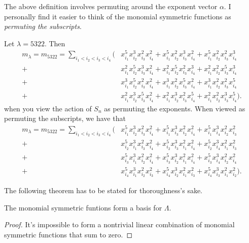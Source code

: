 \documentclass{article}
\begin{document}
The above definition involves permuting around the exponent vector $\alpha$. 
I personally find it easier to think of the monomial symmetric functions as \textit{permuting the subscripts}. 

\begin{example}
    Let $\lambda = 5322$. Then
    \begin{align*}
        m_\lambda = m_{5322} = \sum_{i_1<i_2<i_3<i_4} \Big(&x_{i_1}^5x_{i_2}^3x_{i_3}^2x_{i_4}^2 + x_{i_1}^5x_{i_2}^2x_{i_3}^3x_{i_4}^2 + x_{i_1}^5x_{i_2}^2x_{i_3}^2x_{i_4}^3 \\ 
            + &x_{i_1}^2x_{i_2}^5x_{i_3}^3x_{i_4}^2 + x_{i_1}^2x_{i_2}^5x_{i_3}^2x_{i_4}^3 + x_{i_1}^2x_{i_2}^2x_{i_3}^5x_{i_4}^3  \\
            + &x_{i_1}^3x_{i_2}^5x_{i_3}^2x_{i_4}^2 + x_{i_1}^3x_{i_2}^2x_{i_3}^5x_{i_4}^2 + x_{i_1}^3x_{i_2}^2x_{i_3}^2x_{i_4}^5  \\
        + &x_{i_1}^2x_{i_2}^3x_{i_3}^5x_{i_4}^2 + x_{i_1}^2x_{i_2}^3x_{i_3}^2x_{i_4}^5 + x_{i_1}^2x_{i_2}^2x_{i_3}^3x_{i_4}^5 \Big).
    \end{align*}
    when you view the action of $S_n$ as permuting the exponents. When viewed as permuting the subscripts, we have that
    \begin{align*}
        m_\lambda = m_{5322} = \sum_{i_1<i_2<i_3<i_4} \Big(
        &x_{i_1}^5x_{i_2}^3x_{i_3}^2x_{i_4}^2
        + x_{i_1}^5x_{i_3}^3x_{i_2}^2x_{i_4}^2
        + x_{i_1}^5x_{i_4}^3x_{i_2}^2x_{i_3}^2 \\
        + &x_{i_2}^5x_{i_1}^3x_{i_3}^2x_{i_4}^2
        + x_{i_2}^5x_{i_3}^3x_{i_1}^2x_{i_4}^2
        + x_{i_2}^5x_{i_4}^3x_{i_1}^2x_{i_3}^2 \\
        + &x_{i_3}^5x_{i_1}^3x_{i_2}^2x_{i_4}^2
        + x_{i_3}^5x_{i_2}^3x_{i_1}^2x_{i_4}^2
        + x_{i_3}^5x_{i_4}^3x_{i_2}^2x_{i_4}^2 \\
        + &x_{i_4}^5x_{i_1}^3x_{i_2}^2x_{i_3}^2
        + x_{i_4}^5x_{i_2}^3x_{i_1}^2x_{i_3}^2
        + x_{i_4}^5x_{i_3}^3x_{i_1}^2x_{i_2}^2
    \Big).
    \end{align*}
\end{example}

The following theorem has to be stated for thoroughness's sake.

\begin{theorem}
    The monomial symmetric funtions form a basis for $\Lambda$.
\end{theorem}

\begin{proof}
    It's impossible to form a nontrivial linear combination of monomial symmetric functions that sum to zero.
\end{proof}
\end{document}
